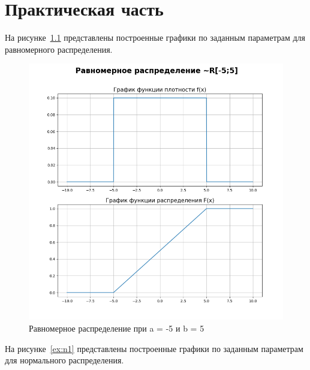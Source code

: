 \chapter{Практическая часть}

На рисунке~\ref{ex:r1} представлены построенные графики по заданным параметрам для равномерного распределения.

\begin{figure}[ht!]
	\centering
	\includegraphics[width=0.8\linewidth]{img/r1.png}
	\caption{Равномерное распределение при a = -5 и b = 5}
	\label{ex:r1}
\end{figure}

\clearpage


%
На рисунке~\ref{ex:n1} представлены построенные графики по заданным параметрам для нормального распределения.

